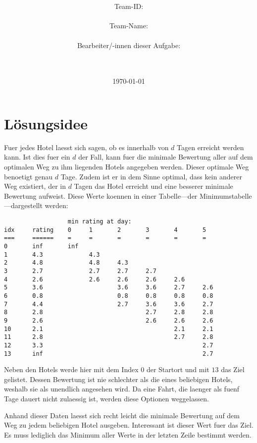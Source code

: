 \documentclass[a4paper,10pt,ngerman]{scrartcl}
\title{\textbf{\Huge\Aufgabe}}
\author{\LARGE Team-ID: \LARGE \TeamId \\\\
	    \LARGE Team-Name: \LARGE \TeamName \\\\
	    \LARGE Bearbeiter/-innen dieser Aufgabe: \\ 
	    \LARGE \Namen\\\\}
\date{\LARGE\today}
\begin{document}
\maketitle
\tableofcontents

\vspace{0.5cm}

\section{Lösungsidee}
Fuer jedes Hotel laesst sich sagen, ob es innerhalb von $d$ Tagen erreicht werden kann.
Ist dies fuer ein $d$ der Fall, kann fuer die minimale Bewertung aller auf dem optimalen Weg zu ihm liegenden Hotels angegeben werden.
Dieser optimale Weg benoetigt genau $d$ Tage.
Zudem ist er in dem Sinne optimal, dass kein anderer Weg existiert, der in $d$ Tagen das Hotel erreicht und eine besserer minimale Bewertung aufweist.
Diese Werte koennen in einer Tabelle---der Minimumstabelle---dargestellt werden:
\begin{lstlisting}
                  min rating at day:
idx     rating    0     1       2       3       4       5
===     ======    =     =       =       =       =       =
0       inf       inf
1       4.3             4.3
2       4.8             4.8     4.3
3       2.7             2.7     2.7     2.7
4       2.6             2.6     2.6     2.6     2.6
5       3.6                     3.6     3.6     2.7     2.6
6       0.8                     0.8     0.8     0.8     0.8
7       4.4                     2.7     3.6     3.6     2.7
8       2.8                             2.7     2.8     2.8
9       2.6                             2.6     2.6     2.6
10      2.1                                     2.1     2.1
11      2.8                                     2.7     2.8
12      3.3                                             2.7
13      inf                                             2.7
\end{lstlisting}
Neben den Hotels werde hier mit dem Index $0$ der Startort und mit $13$ das Ziel gelistet.
Dessen Bewertung ist nie schlechter als die eines beliebigen Hotels, weshalb sie als unendlich angesehen wird.
Da eine Fahrt, die laenger als fuenf Tage dauert nicht zulaessig ist, werden diese Optionen weggelassen.

Anhand dieser Daten laesst sich recht leicht die minimale Bewertung auf dem Weg zu jedem beliebigen Hotel ausgeben.
Interessant ist dieser Wert fuer das Ziel.
Es muss lediglich das Minimum aller Werte in der letzten Zeile bestimmt werden.
\end{document}

